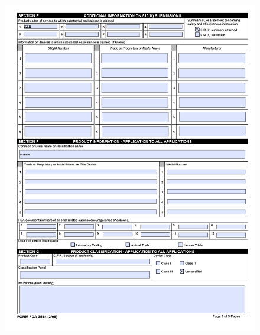 \begin{figure}[H]
  \centering
  \includegraphics[width=\linewidth]{pages/cdrh-pics/3}
  \label{fig:summary}
\end{figure}

